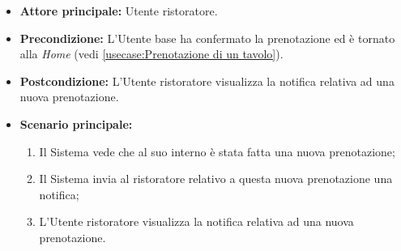 \label{usecase:Visualizzazione notifica nuova prenotazione}
\begin{itemize}
	\item \textbf{Attore principale:} Utente ristoratore.
	
	\item \textbf{Precondizione:} L'Utente base ha confermato la prenotazione ed è tornato alla \textit{Home} (vedi \autoref{usecase:Prenotazione di un tavolo}).

	\item \textbf{Postcondizione:} L'Utente ristoratore visualizza la notifica relativa ad una nuova prenotazione.
     
	\item \textbf{Scenario principale:}
	      \begin{enumerate}
                \item Il Sistema vede che al suo interno è stata fatta una nuova prenotazione;
                \item Il Sistema invia al ristoratore relativo a questa nuova prenotazione una notifica;
                \item L'Utente ristoratore visualizza la notifica relativa ad una nuova prenotazione.
	      \end{enumerate}
\end{itemize}